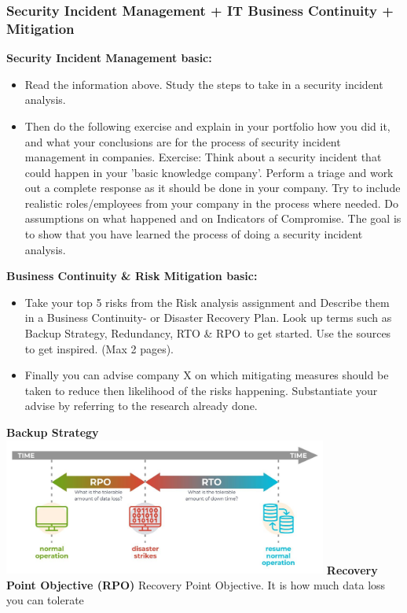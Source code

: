 \documentclass[12pt, letterpaper]{article}
\begin{document}
\subsubsection{Security Incident Management + IT Business Continuity + Mitigation}
\textbf{Security Incident Management basic:}
\begin{itemize}
\item Read the information above. Study the steps to take in a security incident analysis.
\item Then do the following exercise and explain in your portfolio how you did it, and what your conclusions are for the process of security incident management in companies. Exercise: Think about a security incident that could happen in your 'basic knowledge company'. Perform a triage and work out a complete response as it should be done in your company. Try to include realistic roles/employees from your company in the process where needed. Do assumptions on what happened and on Indicators of Compromise. The goal is to show that you have learned the process of doing a security incident analysis.
\end{itemize}
\textbf{Business Continuity \& Risk Mitigation basic:}
\begin{itemize}
    \item Take your top 5 risks from the Risk analysis assignment and Describe them in a Business Continuity- or Disaster Recovery Plan. Look up terms such as Backup Strategy, Redundancy, RTO \& RPO to get started. Use the sources to get inspired. (Max 2 pages).
    \item Finally you can advise company X on which mitigating measures should be taken to reduce then likelihood of the risks happening. Substantiate your advise by referring to the research already done.
\end{itemize}
\textbf{Backup Strategy}
\hfill\break
\hfill\break
\includegraphics[width=0.8\textwidth]{fotos/Week 1011/Risk mitigation/Disaster.jpeg}
\hfill\break
\textbf{Recovery Point Objective (RPO)}
\hfill\break
Recovery Point Objective. It is how much data loss you can tolerate 
\end{document}
